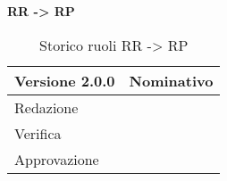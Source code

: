 \textbf{RR -> RP}
\label{tabVers2}
\begin{table}[h]
	\begin{tabular}{p{} p{}}
		\toprule \textbf{Versione 2.0.0}	&	\textbf{Nominativo}\\
		\midrule Redazione	& \TP\\
		\midrule Verifica &	\BM\\
		\midrule Approvazione	& \VG\\
		\bottomrule
	\end{tabular}
	\caption{Storico ruoli RR -> RP}
\end{table}